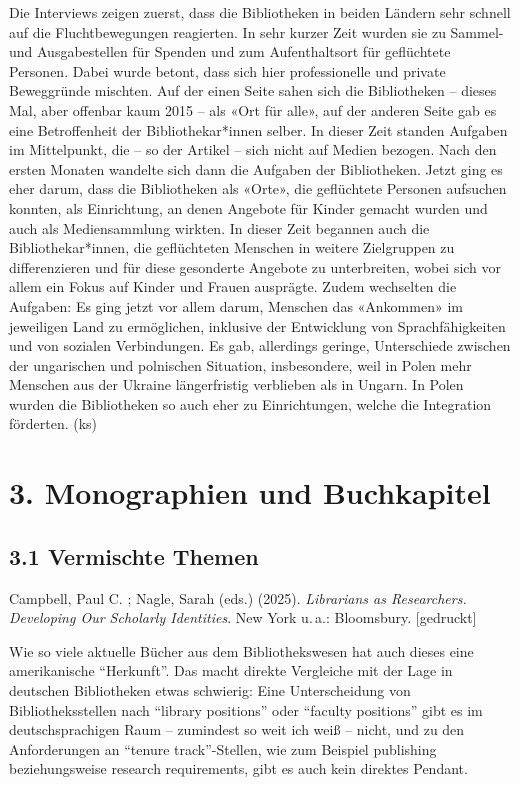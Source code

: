 \documentclass[a4paper,
fontsize=11pt,
oneside,
numbers=noperiodatend,
parskip=half-,
bibliography=totoc,
final
]{scrartcl}
\begin{document}
Die Interviews zeigen zuerst, dass die Bibliotheken in beiden Ländern
sehr schnell auf die Fluchtbewegungen reagierten. In sehr kurzer Zeit
wurden sie zu Sammel- und Ausgabestellen für Spenden und zum
Aufenthaltsort für geflüchtete Personen. Dabei wurde betont, dass sich
hier professionelle und private Beweggründe mischten. Auf der einen
Seite sahen sich die Bibliotheken -- dieses Mal, aber offenbar kaum 2015
-- als «Ort für alle», auf der anderen Seite gab es eine Betroffenheit
der Bibliothekar*innen selber. In dieser Zeit standen Aufgaben im
Mittelpunkt, die -- so der Artikel -- sich nicht auf Medien bezogen.
Nach den ersten Monaten wandelte sich dann die Aufgaben der
Bibliotheken. Jetzt ging es eher darum, dass die Bibliotheken als
«Orte», die geflüchtete Personen aufsuchen konnten, als Einrichtung, an
denen Angebote für Kinder gemacht wurden und auch als Mediensammlung
wirkten. In dieser Zeit begannen auch die Bibliothekar*innen, die
geflüchteten Menschen in weitere Zielgruppen zu differenzieren und für
diese gesonderte Angebote zu unterbreiten, wobei sich vor allem ein
Fokus auf Kinder und Frauen ausprägte. Zudem wechselten die Aufgaben: Es
ging jetzt vor allem darum, Menschen das «Ankommen» im jeweiligen Land
zu ermöglichen, inklusive der Entwicklung von Sprachfähigkeiten und von
sozialen Verbindungen. Es gab, allerdings geringe, Unterschiede zwischen
der ungarischen und polnischen Situation, insbesondere, weil in Polen
mehr Menschen aus der Ukraine längerfristig verblieben als in Ungarn. In
Polen wurden die Bibliotheken so auch eher zu Einrichtungen, welche die
Integration förderten. (ks)

\section{3. Monographien und
Buchkapitel}\label{monographien-und-buchkapitel}

\subsection{3.1 Vermischte Themen}\label{vermischte-themen-1}

Campbell, Paul C. ; Nagle, Sarah (eds.) (2025). \emph{Librarians as
Researchers. Developing Our Scholarly Identities}. New York u.\,a.:
Bloomsbury. {[}gedruckt{]}

Wie so viele aktuelle Bücher aus dem Bibliothekswesen hat auch dieses
eine amerikanische \enquote{Herkunft}. Das macht direkte Vergleiche mit
der Lage in deutschen Bibliotheken etwas schwierig: Eine Unterscheidung
von Bibliotheksstellen nach \enquote{library positions} oder
\enquote{faculty positions} gibt es im deutschsprachigen Raum --
zumindest so weit ich weiß -- nicht, und zu den Anforderungen an
\enquote{tenure track}-Stellen, wie zum Beispiel publishing
beziehungsweise research requirements, gibt es auch kein direktes
Pendant.
\end{document}
